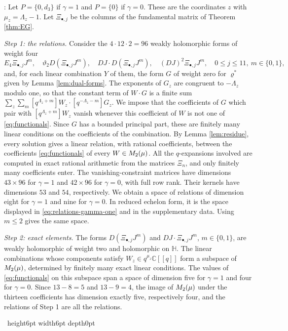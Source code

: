 \documentclass[leqno]{article}
\newcommand{\Cbb}{\ensuremath{\mathbb{C}}}
\let\cal\relax
\newcommand{\cal}{\mathcal}
\renewcommand{\leq}{\ensuremath{\leqslant}}
\newcommand{\qed}{\hfill \vrule height6pt  width6pt depth0pt}
\newenvironment{proof}[1][]{\noindent {\it Proof #1} : }{\hbox{~}\qed
\smallskip
}
\numberwithin{equation}{section}
\begin{document}
\begin{proof}
Let $P = \{0,d_3\}$ if $\gamma = 1$ and $P = \{0\}$ if $\gamma = 0$. These are the coordinates $z$ with $\mu_z = \Lambda_z-1$. Let $\Xi_{\bullet,j}$ be the columns of the fundamental matrix of Theorem \ref{thm:EG}.

\textit{Step 1: the relations.} Consider the $4 \cdot 12 \cdot 2 = 96$ weakly holomorphic forms of weight four
\[
E_4 \Xi_{\bullet,j}J^m,\quad \vartheta_2D(\Xi_{\bullet,j}J^m),\quad DJ \cdot D(\Xi_{\bullet,j}J^m),\quad (DJ)^2 \Xi_{\bullet,j}J^m,\quad 0 \leq j \leq 11,\ m \in \{0,1\},
\]
and, for each linear combination $Y$ of them, the form $G$ of weight zero for $\varrho^*$ given by Lemma \ref{lem:dual-forms}. The exponents of $G_z$ are congruent to $-\Lambda_z$ modulo one, so that the constant term of $W \cdot G$ is a finite sum $\sum_z\sum_m [q^{\Lambda_z+m}]W_z \cdot [q^{-\Lambda_z-m}]G_z$. We impose that the coefficients of $G$ which pair with $[q^{\Lambda_z+m}]W_z$ vanish whenever this coefficient of $W$ is not one of \eqref{eq:functionals}. Since $G$ has a bounded principal part, these are finitely many linear conditions on the coefficients of the combination. By Lemma \ref{lem:residue}, every solution gives a linear relation, with rational coefficients, between the coefficients \eqref{eq:functionals} of every $W \in \cal M_2(\mu)$. All the $q$-expansions involved are computed in exact rational arithmetic from the matrices $\Xi_n$, and only finitely many coefficients enter. The vanishing-constraint matrices have dimensions $43 \times 96$ for $\gamma = 1$ and $42 \times 96$ for $\gamma = 0$, with full row rank. Their kernels have dimensions $53$ and $54$, respectively. We obtain a space of relations of dimension eight for $\gamma = 1$ and nine for $\gamma = 0$. In reduced echelon form, it is the space displayed in \eqref{eq:relations-gamma-one} and in the supplementary data. Using $m \leq 2$ gives the same space.

\textit{Step 2: exact elements.} The forms $D(\Xi_{\bullet,j}J^m)$ and $DJ \cdot \Xi_{\bullet,j}J^m$, $m \in \{0,1\}$, are weakly holomorphic of weight two and holomorphic on $\mathbb H$. The linear combinations whose components satisfy $W_z \in q^{\mu_z}\Cbb[[q]]$ form a subspace of $\cal M_2(\mu)$, determined by finitely many exact linear conditions. The values of \eqref{eq:functionals} on this subspace span a space of dimension five for $\gamma = 1$ and four for $\gamma = 0$. Since $13-8 = 5$ and $13-9 = 4$, the image of $\cal M_2(\mu)$ under the thirteen coefficients has dimension exactly five, respectively four, and the relations of Step 1 are all the relations.


\end{proof}
\end{document}
